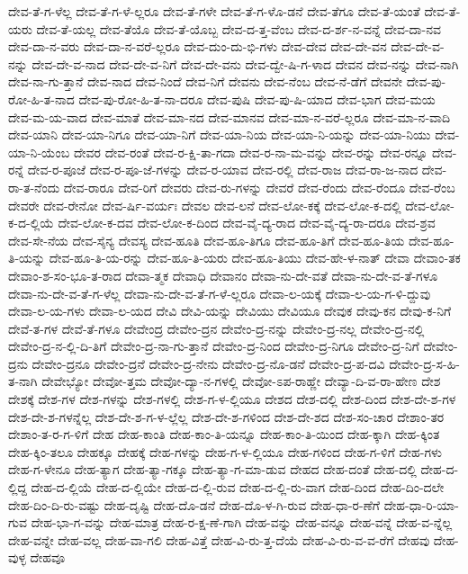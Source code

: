 {ದೇವ-ತೆ-ಗ-ಳೆಲ್ಲ
ದೇವ-ತೆ-ಗ-ಳೆ-ಲ್ಲರೂ
ದೇವ-ತೆ-ಗಳೇ
ದೇವ-ತೆ-ಗ-ಳೊ-ಡನೆ
ದೇವ-ತೆಗೂ
ದೇವ-ತೆ-ಯಂತೆ
ದೇವ-ತೆ-ಯರು
ದೇವ-ತೆ-ಯಲ್ಲ
ದೇವ-ತೆಯೊ
ದೇವ-ತೆ-ಯೊಬ್ಬ
ದೇವ-ದ-ತ್ತ-ವೆಂಬ
ದೇವ-ದ-ರ್ಶ-ನ-ವನ್ನೆ
ದೇವ-ದಾ-ನವ
ದೇವ-ದಾ-ನ-ವರು
ದೇವ-ದಾ-ನ-ವರೆ-ಲ್ಲರೂ
ದೇವ-ದುಂ-ದು-ಭಿ-ಗಳು
ದೇವ-ದೇವ
ದೇವ-ದೇ-ವನ
ದೇವ-ದೇ-ವ-ನನ್ನು
ದೇವ-ದೇ-ವ-ನಾದ
ದೇವ-ದೇ-ವ-ನಿಗೆ
ದೇವ-ದೇ-ವನು
ದೇವ-ದ್ವೇ-ಷಿ-ಗ-ಳಾದ
ದೇವನ
ದೇವ-ನನ್ನು
ದೇವ-ನಾಗಿ
ದೇವ-ನಾ-ಗು-ತ್ತಾನೆ
ದೇವ-ನಾದ
ದೇವ-ನಿಂದೆ
ದೇವ-ನಿಗೆ
ದೇವನು
ದೇವ-ನೆಂಬ
ದೇವ-ನೆ-ಡೆಗೆ
ದೇವನೇ
ದೇವ-ಪು-ರೋ-ಹಿ-ತ-ನಾದ
ದೇವ-ಪು-ರೋ-ಹಿ-ತ-ನಾ-ದರೂ
ದೇವ-ಪುಷಿ
ದೇವ-ಪು-ಷಿ-ಯಾದ
ದೇವ-ಭಾಗ
ದೇವ-ಮಯ
ದೇವ-ಮ-ಯ-ವಾದ
ದೇವ-ಮಾತೆ
ದೇವ-ಮಾ-ನದ
ದೇವ-ಮಾನವ
ದೇವ-ಮಾ-ನ-ವರೆ-ಲ್ಲರೂ
ದೇವ-ಮಾ-ನ-ವಾದಿ
ದೇವ-ಯಾನಿ
ದೇವ-ಯಾ-ನಿಗೂ
ದೇವ-ಯಾ-ನಿಗೆ
ದೇವ-ಯಾ-ನಿಯ
ದೇವ-ಯಾ-ನಿ-ಯನ್ನು
ದೇವ-ಯಾ-ನಿಯು
ದೇವ-ಯಾ-ನಿ-ಯೆಂಬ
ದೇವರ
ದೇವ-ರಂತೆ
ದೇವ-ರ-ಕ್ಷಿ-ತಾ-ಗದಾ
ದೇವ-ರ-ನಾ-ಮ-ವನ್ನು
ದೇವ-ರನ್ನು
ದೇವ-ರನ್ನೂ
ದೇವ-ರನ್ನೆ
ದೇವ-ರ-ಪೂಜೆ
ದೇವ-ರ-ಪೂ-ಜೆ-ಗಳನ್ನು
ದೇವ-ರ-ಯಾವ
ದೇವ-ರಲ್ಲಿ
ದೇವ-ರಾಜ
ದೇವ-ರಾ-ಜ-ನಾದ
ದೇವ-ರಾ-ತ-ನೆಂದು
ದೇವ-ರಾರೂ
ದೇವ-ರಿಗೆ
ದೇವರು
ದೇವ-ರು-ಗಳನ್ನು
ದೇವರೆ
ದೇವ-ರೆಂದು
ದೇವ-ರೆಂದೂ
ದೇವ-ರೆಂಬ
ದೇವರೇ
ದೇವ-ರೇನೋ
ದೇವ-ರ್ಷಿ-ವರ್ಯಃ
ದೇವಲ
ದೇವ-ಲನೆ
ದೇವ-ಲೋ-ಕಕ್ಕೆ
ದೇವ-ಲೋ-ಕ-ದಲ್ಲಿ
ದೇವ-ಲೋ-ಕ-ದ-ಲ್ಲಿಯೆ
ದೇವ-ಲೋ-ಕ-ದವ
ದೇವ-ಲೋ-ಕ-ದಿಂದ
ದೇವ-ವೈ-ದ್ಯ-ರಾದ
ದೇವ-ವೈ-ದ್ಯ-ರಾ-ದರೂ
ದೇವ-ಶ್ರವ
ದೇವ-ಸೇ-ನೆಯ
ದೇವ-ಸೈನ್ಯ
ದೇವಸ್ಯ
ದೇವ-ಹೂತಿ
ದೇವ-ಹೂ-ತಿಗೂ
ದೇವ-ಹೂ-ತಿಗೆ
ದೇವ-ಹೂ-ತಿಯ
ದೇವ-ಹೂ-ತಿ-ಯನ್ನು
ದೇವ-ಹೂ-ತಿ-ಯ-ರನ್ನು
ದೇವ-ಹೂ-ತಿ-ಯರು
ದೇವ-ಹೂ-ತಿಯು
ದೇವ-ಹೇ-ಳ-ನಾತ್
ದೇವಾ
ದೇವಾಂ-ತಕ
ದೇವಾಂ-ಶ-ಸಂ-ಭೂ-ತ-ರಾದ
ದೇವಾ-ತ್ಮಕ
ದೇವಾಧಿ
ದೇವಾನಂ
ದೇವಾ-ನು-ದೇ-ವತೆ
ದೇವಾ-ನು-ದೇ-ವ-ತೆ-ಗಳೂ
ದೇವಾ-ನು-ದೇ-ವ-ತೆ-ಗ-ಳೆಲ್ಲ
ದೇವಾ-ನು-ದೇ-ವ-ತೆ-ಗ-ಳೆ-ಲ್ಲರೂ
ದೇವಾ-ಲ-ಯಕ್ಕೆ
ದೇವಾ-ಲ-ಯ-ಗ-ಳಿ-ದ್ದುವು
ದೇವಾ-ಲ-ಯ-ಗಳು
ದೇವಾ-ಲ-ಯದ
ದೇವಿ
ದೇವಿ-ಯನ್ನು
ದೇವಿಯು
ದೇವಿಯೂ
ದೇವುಕ
ದೇವು-ಕನ
ದೇವು-ಕ-ನಿಗೆ
ದೇವೆ-ತ-ಗಳ
ದೇವೆ-ತೆ-ಗಳೂ
ದೇವೇಂದ್ರ
ದೇವೇಂ-ದ್ರನ
ದೇವೇಂ-ದ್ರ-ನನ್ನು
ದೇವೇಂ-ದ್ರ-ನಲ್ಲ
ದೇವೇಂ-ದ್ರ-ನಲ್ಲಿ
ದೇವೇಂ-ದ್ರ-ನ-ಲ್ಲಿ-ದಿ-ತಿಗೆ
ದೇವೇಂ-ದ್ರ-ನಾ-ಗು-ತ್ತಾನೆ
ದೇವೇಂ-ದ್ರ-ನಿಂದ
ದೇವೇಂ-ದ್ರ-ನಿಗೂ
ದೇವೇಂ-ದ್ರ-ನಿಗೆ
ದೇವೇಂ-ದ್ರನು
ದೇವೇಂ-ದ್ರನೂ
ದೇವೇಂ-ದ್ರನೆ
ದೇವೇಂ-ದ್ರ-ನೇನು
ದೇವೇಂ-ದ್ರ-ನೊ-ಡನೆ
ದೇವೇಂ-ದ್ರ-ಪ-ದವಿ
ದೇವೇಂ-ದ್ರ-ಸ-ಹಿ-ತ-ನಾಗಿ
ದೇವೇಭ್ಯೋ
ದೇವೋ-ತ್ತಮ
ದೇವೋ-ದ್ಯಾ-ನ-ಗಳಲ್ಲಿ
ದೇವೋ-ಽಪ-ರಾಹ್ಣೇ
ದೇವ್ಯಾ-ದಿ-ವ-ರಾ-ಹೇಣ
ದೇಶ
ದೇಶಕ್ಕೆ
ದೇಶ-ಗಳ
ದೇಶ-ಗಳನ್ನು
ದೇಶ-ಗಳಲ್ಲಿ
ದೇಶ-ಗ-ಳ-ಲ್ಲಿಯೂ
ದೇಶದ
ದೇಶ-ದಲ್ಲಿ
ದೇಶ-ದಿಂದ
ದೇಶ-ದೇ-ಶ-ಗಳ
ದೇಶ-ದೇ-ಶ-ಗಳನ್ನೆಲ್ಲ
ದೇಶ-ದೇ-ಶ-ಗ-ಳ-ಲ್ಲೆಲ್ಲ
ದೇಶ-ದೇ-ಶ-ಗಳಿಂದ
ದೇಶ-ದೇ-ಶದ
ದೇಶ-ಸಂ-ಚಾರ
ದೇಶಾಂ-ತರ
ದೇಶಾಂ-ತ-ರ-ಗ-ಳಿಗೆ
ದೇಹ
ದೇಹ-ಕಾಂತಿ
ದೇಹ-ಕಾಂ-ತಿ-ಯನ್ನೂ
ದೇಹ-ಕಾಂ-ತಿ-ಯಿಂದ
ದೇಹ-ಕ್ಕಾಗಿ
ದೇಹ-ಕ್ಕಿಂತ
ದೇಹ-ಕ್ಕಿಂ-ತಲೂ
ದೇಹಕ್ಕೂ
ದೇಹಕ್ಕೆ
ದೇಹ-ಗಳನ್ನು
ದೇಹ-ಗ-ಳ-ಲ್ಲಿಯೂ
ದೇಹ-ಗಳಿಂದ
ದೇಹ-ಗ-ಳಿಗೆ
ದೇಹ-ಗಳು
ದೇಹ-ಗ-ಳೇನೂ
ದೇಹ-ತ್ಯಾಗ
ದೇಹ-ತ್ಯಾ-ಗಕ್ಕೂ
ದೇಹ-ತ್ಯಾ-ಗ-ಮಾ-ಡುವ
ದೇಹದ
ದೇಹ-ದಂತೆ
ದೇಹ-ದಲ್ಲಿ
ದೇಹ-ದ-ಲ್ಲಿದ್ದ
ದೇಹ-ದ-ಲ್ಲಿಯೆ
ದೇಹ-ದ-ಲ್ಲಿಯೇ
ದೇಹ-ದ-ಲ್ಲಿ-ರುವ
ದೇಹ-ದ-ಲ್ಲಿ-ರು-ವಾಗ
ದೇಹ-ದಿಂದ
ದೇಹ-ದಿಂ-ದಲೇ
ದೇಹ-ದಿಂ-ದಿ-ರು-ವಷ್ಟು
ದೇಹ-ದೃಷ್ಟಿ
ದೇಹ-ದೊ-ಡನೆ
ದೇಹ-ದೊ-ಳ-ಗಿ-ರುವ
ದೇಹ-ಧಾ-ರ-ಣೆಗೆ
ದೇಹ-ಧಾ-ರಿ-ಯಾ-ಗುವ
ದೇಹ-ಭಾ-ಗ-ವನ್ನು
ದೇಹ-ಮಾತ್ರ
ದೇಹ-ರ-ಕ್ಷ-ಣೆ-ಗಾಗಿ
ದೇಹ-ವನ್ನು
ದೇಹ-ವನ್ನೂ
ದೇಹ-ವನ್ನೆ
ದೇಹ-ವ-ನ್ನೆಲ್ಲ
ದೇಹ-ವನ್ನೇ
ದೇಹ-ವಲ್ಲ
ದೇಹ-ವಾ-ಗಲಿ
ದೇಹ-ವಿತ್ತೆ
ದೇಹ-ವಿ-ರು-ತ್ತ-ದೆಯೆ
ದೇಹ-ವಿ-ರು-ವ-ವ-ರೆಗೆ
ದೇಹವು
ದೇಹ-ವುಳ್ಳ
ದೇಹವೂ
}
